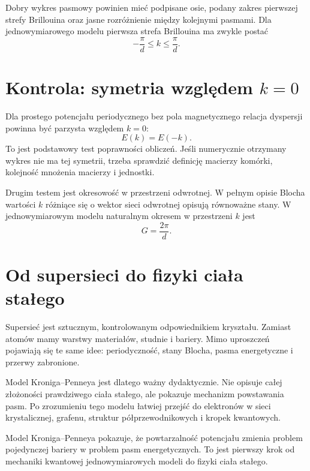 Dobry wykres pasmowy powinien mieć podpisane osie, podany zakres pierwszej strefy Brillouina oraz jasne rozróżnienie między kolejnymi pasmami. Dla jednowymiarowego modelu pierwsza strefa Brillouina ma zwykle postać
\begin{equation}
    -\frac{\pi}{d}\leq k\leq \frac{\pi}{d}.
\end{equation}

\section{Kontrola: symetria względem \texorpdfstring{\(k=0\)}{k=0}}

Dla prostego potencjału periodycznego bez pola magnetycznego relacja dyspersji powinna być parzysta względem \(k=0\):
\begin{equation}
    E(k)=E(-k).
\end{equation}
To jest podstawowy test poprawności obliczeń. Jeśli numerycznie otrzymany wykres nie ma tej symetrii, trzeba sprawdzić definicję macierzy komórki, kolejność mnożenia macierzy i jednostki.

Drugim testem jest okresowość w przestrzeni odwrotnej. W pełnym opisie Blocha wartości \(k\) różniące się o wektor sieci odwrotnej opisują równoważne stany. W jednowymiarowym modelu naturalnym okresem w przestrzeni \(k\) jest
\begin{equation}
    G=\frac{2\pi}{d}.
\end{equation}

\section{Od supersieci do fizyki ciała stałego}

Supersieć jest sztucznym, kontrolowanym odpowiednikiem kryształu. Zamiast atomów mamy warstwy materiałów, studnie i bariery. Mimo uproszczeń pojawiają się te same idee: periodyczność, stany Blocha, pasma energetyczne i przerwy zabronione.

Model Kroniga--Penneya jest dlatego ważny dydaktycznie. Nie opisuje całej złożoności prawdziwego ciała stałego, ale pokazuje mechanizm powstawania pasm. Po zrozumieniu tego modelu łatwiej przejść do elektronów w sieci krystalicznej, grafenu, struktur półprzewodnikowych i kropek kwantowych.

\begin{summarybox}
Model Kroniga--Penneya pokazuje, że powtarzalność potencjału zmienia problem pojedynczej bariery w problem pasm energetycznych. To jest pierwszy krok od mechaniki kwantowej jednowymiarowych modeli do fizyki ciała stałego.
\end{summarybox}
